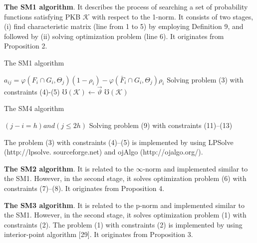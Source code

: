 \documentclass[]{iosart2c}
\begin{document}
  \textbf{The SM1 algorithm}. It describes the process of
  searching a set of probability functions satisfying
  PKB $\mathcal{K}$ with respect to the 1-norm. It consists of two
  stages, (i) find characteristic matrix (line from 1 to 5)
  by employing Definition 9, and followed by (ii) solving
  optimization problem (line 6). It originates from
  Proposition 2.

  \begin{algorithm}
    \caption{The SM1 algorithm}
    \begin{algorithmic}[1]
          \State $a_{ij} = \varphi(F_i \cap G_i,\Theta_j)(1 - \rho_i) - \varphi(\bar{F}_i \cap G_i,\Theta_j )\rho_i$
        \EndFor
      \EndFor
      \State Solving problem (3) with constraints (4)-(5)
      \State $\mho(\mathcal{K}) \gets \vec{\vartheta}$
      \State \Return $\mho(\mathcal{K})$
    \end{algorithmic}
  \end{algorithm}


  \begin{algorithm}
    \caption{The SM4 algorithm}
    \begin{algorithmic}[1]

          \ElsIf
              {$(j - i = h ) and (j \leq 2h)$}
          \Else
          \EndIf
        \EndFor
      \EndFor
      \State Solving problem (9) with constraints (11)–(13)
      \State {}
    \end{algorithmic}
  \end{algorithm}

  The problem (3) with constraints (4)–(5) is implemented by using LPSolve (http://lpsolve. sourceforge.net) and ojAlgo (http://ojalgo.org/).

  \textbf{The SM2 algorithm}. It is related to the $\infty$-norm and implemented similar to the SM1. However, in the second stage, it solves optimization problem (6) with constraints (7)–(8). It originates from Proposition 4.

  \textbf{The SM3 algorithm}. It is related to the p-norm and implemented similar to the SM1. However, in the second stage, it solves optimization problem (1) with constraints (2). The problem (1) with constraints (2) is implemented by using interior-point algorithm [29]. It originates from Proposition 3.
\end{document}
